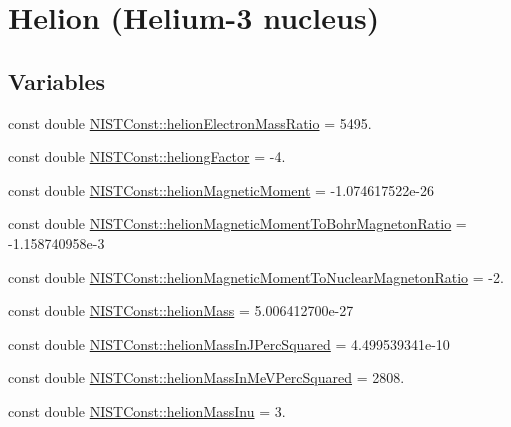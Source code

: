 \hypertarget{group___n_i_s_t_const-_helion}{}\section{Helion (Helium-\/3 nucleus)}
\label{group___n_i_s_t_const-_helion}
\subsection*{Variables}
\begin{DoxyCompactItemize}
\item 
const double \mbox{\hyperlink{group___n_i_s_t_const-_helion_ga5c779784a4f223f0936cb067e2674474}{N\+I\+S\+T\+Const\+::helion\+Electron\+Mass\+Ratio}} = 5495.
\item 
const double \mbox{\hyperlink{group___n_i_s_t_const-_helion_ga93c08fee128607b2609355ea6ddbc76e}{N\+I\+S\+T\+Const\+::heliong\+Factor}} = -\/4.
\item 
const double \mbox{\hyperlink{group___n_i_s_t_const-_helion_ga06d8cffa7452ce8d1d30334e89fddc55}{N\+I\+S\+T\+Const\+::helion\+Magnetic\+Moment}} = -\/1.\+074617522e-\/26
\item 
const double \mbox{\hyperlink{group___n_i_s_t_const-_helion_gab2ead007452b8d42528f8d03d988d149}{N\+I\+S\+T\+Const\+::helion\+Magnetic\+Moment\+To\+Bohr\+Magneton\+Ratio}} = -\/1.\+158740958e-\/3
\item 
const double \mbox{\hyperlink{group___n_i_s_t_const-_helion_ga4abc0d1191b0610736c6f70a56c24562}{N\+I\+S\+T\+Const\+::helion\+Magnetic\+Moment\+To\+Nuclear\+Magneton\+Ratio}} = -\/2.
\item 
const double \mbox{\hyperlink{group___n_i_s_t_const-_helion_gac36ce0665418a2b628ca7c28c8887d2b}{N\+I\+S\+T\+Const\+::helion\+Mass}} = 5.\+006412700e-\/27
\item 
const double \mbox{\hyperlink{group___n_i_s_t_const-_helion_ga51d52d347de11b15efccd0613db9abe3}{N\+I\+S\+T\+Const\+::helion\+Mass\+In\+J\+Perc\+Squared}} = 4.\+499539341e-\/10
\item 
const double \mbox{\hyperlink{group___n_i_s_t_const-_helion_gaa7af65f7f94682dba2c3b50a24dafe02}{N\+I\+S\+T\+Const\+::helion\+Mass\+In\+Me\+V\+Perc\+Squared}} = 2808.
\item 
const double \mbox{\hyperlink{group___n_i_s_t_const-_helion_ga764735e9b705bc9493bd45acb466a7e9}{N\+I\+S\+T\+Const\+::helion\+Mass\+Inu}} = 3.
\item 

\end{DoxyCompactItemize}
